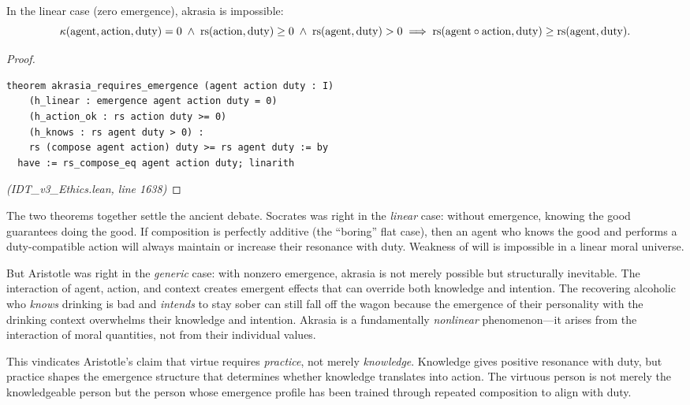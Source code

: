 \begin{theorem}
\label{thm:akrasia-requires-emergence}
In the linear case (zero emergence), akrasia is impossible:
\[
  \kappa(\mathrm{agent}, \mathrm{action}, \mathrm{duty}) = 0
  \;\wedge\; \mathrm{rs}(\mathrm{action}, \mathrm{duty}) \geq 0
  \;\wedge\; \mathrm{rs}(\mathrm{agent}, \mathrm{duty}) > 0
  \implies
  \mathrm{rs}(\mathrm{agent} \circ \mathrm{action}, \mathrm{duty}) \geq
  \mathrm{rs}(\mathrm{agent}, \mathrm{duty}).
\]
\end{theorem}

\begin{proof}
\begin{lstlisting}
theorem akrasia_requires_emergence (agent action duty : I)
    (h_linear : emergence agent action duty = 0)
    (h_action_ok : rs action duty >= 0)
    (h_knows : rs agent duty > 0) :
    rs (compose agent action) duty >= rs agent duty := by
  have := rs_compose_eq agent action duty; linarith
\end{lstlisting}
\textit{(IDT\_v3\_Ethics.lean, line 1638)}
\end{proof}

\begin{interpretation}
The two theorems together settle the ancient debate. Socrates was right in the
\emph{linear} case: without emergence, knowing the good guarantees doing the good.
If composition is perfectly additive (the ``boring'' flat case), then an agent
who knows the good and performs a duty-compatible action will always maintain
or increase their resonance with duty. Weakness of will is impossible in a
linear moral universe.

But Aristotle was right in the \emph{generic} case: with nonzero emergence,
akrasia is not merely possible but structurally inevitable. The interaction
of agent, action, and context creates emergent effects that can override
both knowledge and intention. The recovering alcoholic who \emph{knows}
drinking is bad and \emph{intends} to stay sober can still fall off the
wagon because the emergence of their personality with the drinking context
overwhelms their knowledge and intention. Akrasia is a fundamentally
\emph{nonlinear} phenomenon---it arises from the interaction of moral
quantities, not from their individual values.

This vindicates Aristotle's claim that virtue requires \emph{practice},
not merely \emph{knowledge}. Knowledge gives positive resonance with duty,
but practice shapes the emergence structure that determines whether
knowledge translates into action. The virtuous person is not merely the
knowledgeable person but the person whose emergence profile has been
trained through repeated composition to align with duty.
\end{interpretation}

